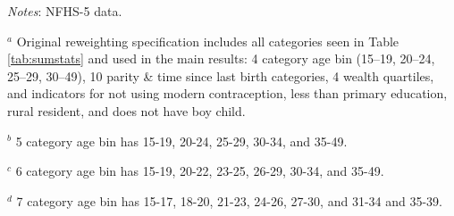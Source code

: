 \documentclass[12pt]{article}
\begin{document}
\begin{landscape}
    


\begin{table}[H]
    \centering

    \begin{threeparttable}
            
    \caption{: Prepregnancy underweight estimates are robust to reweighting over different sets of variables}
    \label{specifications}
    \renewcommand{\arraystretch}{1.5}
    \scriptsize
    \setlength{\tabcolsep}{5pt}
    \resizebox{\textwidth}{!}{%
        
    }
    
    \scriptsize

    
    \begin{tablenotes}
        \item  \textit{Notes}: NFHS-5 data.
        \item $^a$ Original reweighting specification includes all categories seen in Table \ref{tab:sumstats} and used in the main results: 4 category age bin (15–19, 20–24, 25–29, 30–49), 10 parity \& time since last birth categories, 4 wealth quartiles, and indicators for not using modern contraception, less than primary education, rural resident, and does not have boy child.
        \item $^b$ 5 category age bin has 15-19, 20-24, 25-29, 30-34, and 35-49.
        \item $^c$ 6 category age bin has 15-19, 20-22, 23-25, 26-29, 30-34, and 35-49.
        \item $^d$ 7 category age bin has 15-17, 18-20, 21-23, 24-26, 27-30, and 31-34 and 35-39.
    \end{tablenotes}

    
    
    \end{threeparttable}
\end{table}


\end{landscape}
\end{document}
